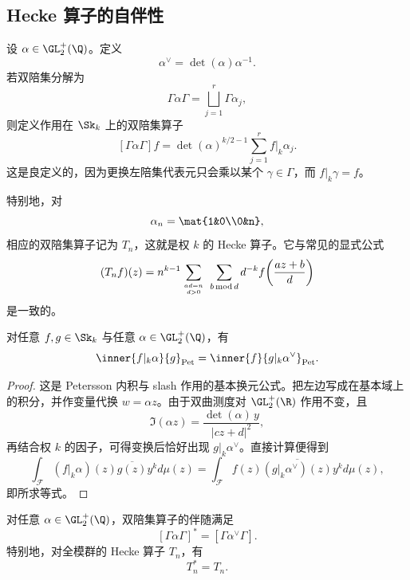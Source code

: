 \subsection{Hecke 算子的自伴性}

设 $\alpha\in \GL_2^+(\Q)$。定义
\[
\alpha^{\vee}=\det(\alpha)\alpha^{-1}.
\]
若双陪集分解为
\[
\Gamma\alpha\Gamma=\bigsqcup_{j=1}^r \Gamma\alpha_j,
\]
则定义作用在 $\Sk_k$ 上的双陪集算子
\[
[\Gamma\alpha\Gamma]f=\det(\alpha)^{k/2-1}\sum_{j=1}^r f|_k\alpha_j.
\]
这是良定义的，因为更换左陪集代表元只会乘以某个 $\gamma\in\Gamma$，而 $f|_k\gamma=f$。

特别地，对
\[
\alpha_n=\mat{1&0\\0&n},
\]
相应的双陪集算子记为 $T_n$，这就是权 $k$ 的 Hecke 算子。它与常见的显式公式
\[
(T_nf)(z)=n^{k-1}\sum_{ad=n\atop d>0}\ \sum_{b\,\mathrm{mod}\,d} d^{-k} f\!\left(\frac{az+b}{d}\right)
\]
是一致的。

\begin{lemma}
对任意 $f,g\in \Sk_k$ 与任意 $\alpha\in \GL_2^+(\Q)$，有
\[
\inner{f|_k\alpha}{g}_{\mathrm{Pet}}=\inner{f}{g|_k\alpha^{\vee}}_{\mathrm{Pet}}.
\]
\end{lemma}

\begin{proof}
这是 Petersson 内积与 slash 作用的基本换元公式。把左边写成在基本域上的积分，并作变量代换 $w=\alpha z$。由于双曲测度对 $\GL_2^+(\R)$ 作用不变，且
\[
\Im(\alpha z)=\frac{\det(\alpha)\,y}{|cz+d|^2},
\]
再结合权 $k$ 的因子，可得变换后恰好出现 $g|_k\alpha^{\vee}$。直接计算便得到
\[
\int_{\mathcal{F}} (f|_k\alpha)(z)\overline{g(z)}y^k d\mu(z)
=
\int_{\mathcal{F}} f(z)\overline{(g|_k\alpha^{\vee})(z)}y^k d\mu(z),
\]
即所求等式。
\end{proof}

\begin{theorem}
对任意 $\alpha\in \GL_2^+(\Q)$，双陪集算子的伴随满足
\[
[\Gamma\alpha\Gamma]^*=[\Gamma\alpha^{\vee}\Gamma].
\]
特别地，对全模群的 Hecke 算子 $T_n$，有
\[
T_n^*=T_n.
\]
\end{theorem}

